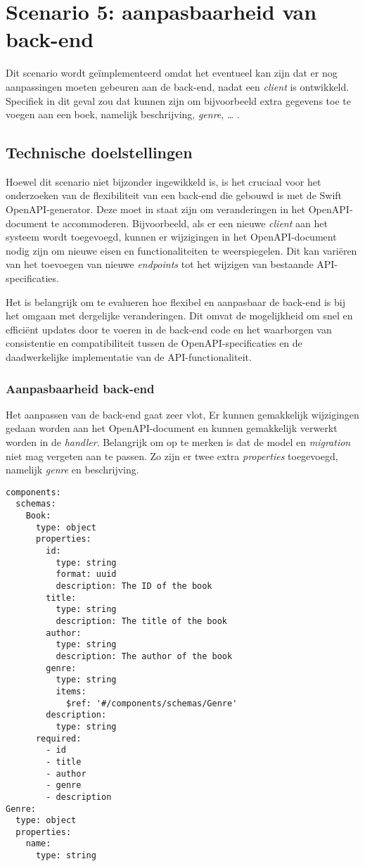 \section{Scenario 5: aanpasbaarheid van back-end}
Dit scenario wordt geïmplementeerd omdat het eventueel kan zijn dat er nog aanpassingen moeten gebeuren aan de back-end, nadat een \textit{client} is ontwikkeld. 
Specifiek in dit geval zou dat kunnen zijn om bijvoorbeeld extra gegevens toe te voegen aan een boek, namelijk beschrijving, \textit{genre}, … . 


\subsection{Technische doelstellingen}
Hoewel dit scenario niet bijzonder ingewikkeld is, is het cruciaal voor het onderzoeken van de flexibiliteit van een back-end die gebouwd is met de Swift OpenAPI-generator. Deze moet in staat zijn om veranderingen in het OpenAPI-document te accommoderen. Bijvoorbeeld, als er een nieuwe \textit{client} aan het systeem wordt toegevoegd, kunnen er wijzigingen in het OpenAPI-document nodig zijn om nieuwe eisen en functionaliteiten te weerspiegelen. Dit kan variëren van het toevoegen van nieuwe \textit{endpoints} tot het wijzigen van bestaande API-specificaties.

Het is belangrijk om te evalueren hoe flexibel en aanpasbaar de back-end is bij het omgaan met dergelijke veranderingen. Dit omvat de mogelijkheid om snel en efficiënt updates door te voeren in de back-end code en het waarborgen van consistentie en compatibiliteit tussen de OpenAPI-specificaties en de daadwerkelijke implementatie van de API-functionaliteit.

\subsubsection{Aanpasbaarheid back-end}
Het aanpassen van de back-end gaat zeer vlot, Er kunnen gemakkelijk wijzigingen gedaan worden aan het OpenAPI-document en kunnen gemakkelijk verwerkt worden in de \textit{handler}. Belangrijk om op te merken is dat de model en \textit{migration} niet mag vergeten aan te passen. Zo zijn er twee extra \textit{properties}  toegevoegd, namelijk \textit{genre} en beschrijving. 

\begin{lstlisting}[caption=openapi.yaml file]
components:
  schemas:
    Book:
      type: object
      properties:
        id:
          type: string
          format: uuid
          description: The ID of the book
        title:
          type: string
          description: The title of the book
        author:
          type: string
          description: The author of the book
        genre:
          type: string
          items:
            $ref: '#/components/schemas/Genre'
        description:
          type: string
      required:
        - id
        - title
        - author
        - genre
        - description
Genre:
  type: object
  properties:
    name:
      type: string
\end{lstlisting}

